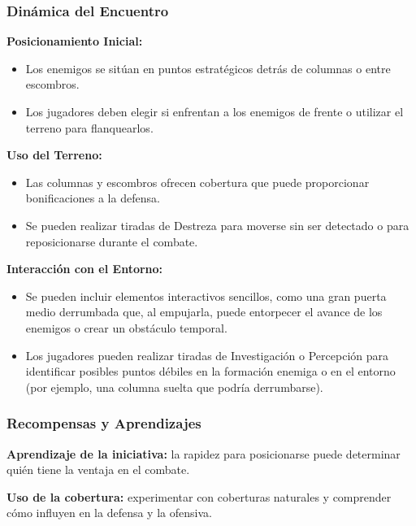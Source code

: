 \documentclass[
  twocolumn]{article}
\providecommand{\tightlist}{%
  \setlength{\itemsep}{0pt}\setlength{\parskip}{0pt}}
\begin{document}
\subsubsection{Dinámica del Encuentro}\label{dinuxe1mica-del-encuentro}

\textbf{Posicionamiento Inicial:}

\begin{itemize}
\tightlist
\item
  Los enemigos se sitúan en puntos estratégicos detrás de columnas o
  entre escombros.
\item
  Los jugadores deben elegir si enfrentan a los enemigos de frente o
  utilizar el terreno para flanquearlos.
\end{itemize}

\textbf{Uso del Terreno:}

\begin{itemize}
\tightlist
\item
  Las columnas y escombros ofrecen cobertura que puede proporcionar
  bonificaciones a la defensa.
\item
  Se pueden realizar tiradas de Destreza para moverse sin ser detectado
  o para reposicionarse durante el combate.
\end{itemize}

\textbf{Interacción con el Entorno:}

\begin{itemize}
\tightlist
\item
  Se pueden incluir elementos interactivos sencillos, como una gran
  puerta medio derrumbada que, al empujarla, puede entorpecer el avance
  de los enemigos o crear un obstáculo temporal.
\item
  Los jugadores pueden realizar tiradas de Investigación o Percepción
  para identificar posibles puntos débiles en la formación enemiga o en
  el entorno (por ejemplo, una columna suelta que podría derrumbarse).
\end{itemize}

\subsubsection{Recompensas y
Aprendizajes}\label{recompensas-y-aprendizajes}

\textbf{Aprendizaje de la iniciativa:} la rapidez para posicionarse
puede determinar quién tiene la ventaja en el combate.

\textbf{Uso de la cobertura:} experimentar con coberturas naturales y
comprender cómo influyen en la defensa y la ofensiva.
\end{document}
